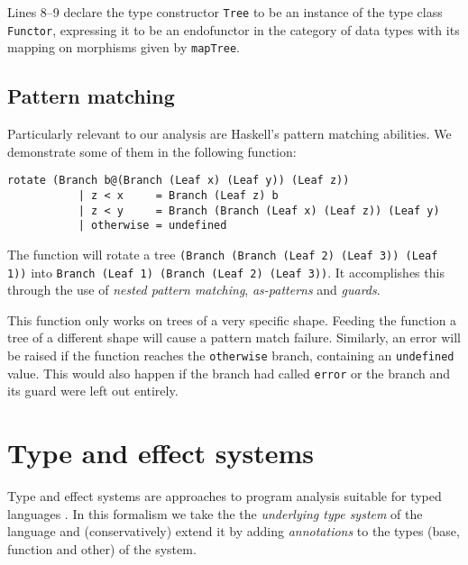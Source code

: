 \documentclass[a4paper]{report}
\begin{document}
Lines 8--9 declare the type constructor {\tt Tree} to be an instance of the type class {\tt Functor}, expressing it to be an endofunctor in the category of data types with its mapping on morphisms given by {\tt mapTree}.

\subsection{Pattern matching}

Particularly relevant to our analysis are Haskell's pattern matching abilities. We demonstrate some of them in the following function:

\begin{verbatim}
rotate (Branch b@(Branch (Leaf x) (Leaf y)) (Leaf z))
           | z < x     = Branch (Leaf z) b
           | z < y     = Branch (Branch (Leaf x) (Leaf z)) (Leaf y)
           | otherwise = undefined
\end{verbatim}

The function will rotate a tree {\tt (Branch (Branch (Leaf 2) (Leaf 3)) (Leaf 1))} into {\tt Branch (Leaf 1) (Branch (Leaf 2) (Leaf 3))}. It accomplishes this through the use of \emph{nested pattern matching}, \emph{as-patterns} and \emph{guards}.

This function only works on trees of a very specific shape. Feeding the function a tree of a different shape will cause a pattern match failure. Similarly, an error will be raised if the function reaches the {\tt otherwise} branch, containing an {\tt undefined} value. This would also happen if the branch had called {\tt error} or the branch and its guard were left out entirely.


\section{Type and effect systems}

Type and effect systems are approaches to program analysis suitable for typed languages \cite{Nielson:1999:PPA:555142}. In this formalism we take the the \emph{underlying type system} of the language and (conservatively) extend it by adding \emph{annotations} to the types (base, function and other) of the system.
\end{document}

